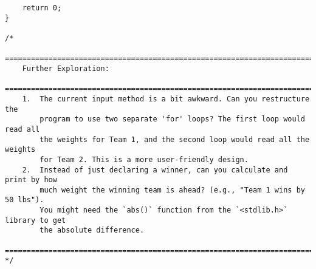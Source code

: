 \documentclass[11pt]{book}
\begin{document}
\begin{verbatim}
    return 0;
}

/*
    ================================================================================
    Further Exploration:
    ================================================================================
    1.  The current input method is a bit awkward. Can you restructure the
        program to use two separate 'for' loops? The first loop would read all
        the weights for Team 1, and the second loop would read all the weights
        for Team 2. This is a more user-friendly design.
    2.  Instead of just declaring a winner, can you calculate and print by how
        much weight the winning team is ahead? (e.g., "Team 1 wins by 50 lbs").
        You might need the `abs()` function from the `<stdlib.h>` library to get
        the absolute difference.
    ================================================================================
*/

\end{verbatim}
\clearpage
\end{document}
